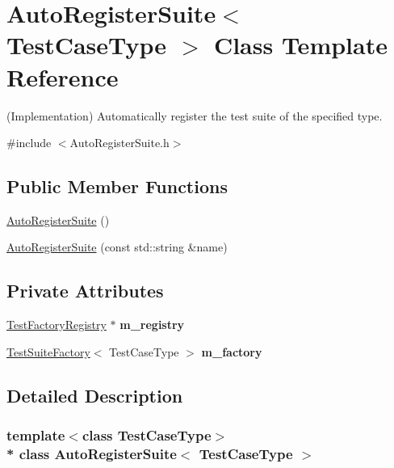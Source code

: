 \hypertarget{class_auto_register_suite}{}\section{Auto\+Register\+Suite$<$ Test\+Case\+Type $>$ Class Template Reference}
\label{class_auto_register_suite}


(Implementation) Automatically register the test suite of the specified type.  




{\ttfamily \#include $<$Auto\+Register\+Suite.\+h$>$}

\subsection*{Public Member Functions}
\begin{DoxyCompactItemize}
\item 
\hyperlink{class_auto_register_suite_a4c02d0d6e3de726f67b875dc5615e22a}{Auto\+Register\+Suite} ()
\item 
\hyperlink{class_auto_register_suite_a9350fa1995545aad03b61b7a6db690e4}{Auto\+Register\+Suite} (const std\+::string \&name)
\end{DoxyCompactItemize}
\subsection*{Private Attributes}
\begin{DoxyCompactItemize}
\item 
\hyperlink{class_test_factory_registry}{Test\+Factory\+Registry} $\ast$ {\bfseries m\+\_\+registry}\hypertarget{class_auto_register_suite_a37234874449a67e300f09f1524779a44}{}\label{class_auto_register_suite_a37234874449a67e300f09f1524779a44}

\item 
\hyperlink{class_test_suite_factory}{Test\+Suite\+Factory}$<$ Test\+Case\+Type $>$ {\bfseries m\+\_\+factory}\hypertarget{class_auto_register_suite_ae1a90501fa160febe6ae219b595b77a8}{}\label{class_auto_register_suite_ae1a90501fa160febe6ae219b595b77a8}

\end{DoxyCompactItemize}


\subsection{Detailed Description}
\subsubsection*{template$<$class Test\+Case\+Type$>$\\*
class Auto\+Register\+Suite$<$ Test\+Case\+Type $>$}


